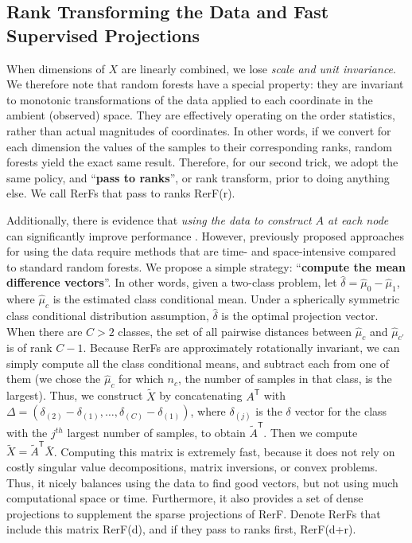 \documentclass{article}
\providecommand{\mt}[1]{\widetilde{#1}}
\providecommand{\mh}[1]{\hat{#1}}
\newcommand{\T}{^{\ensuremath{\mathsf{T}}}}           %
\begin{document}
\subsection{Rank Transforming the Data and Fast Supervised Projections}

When dimensions of $X$ are linearly combined, we lose {\em{scale and unit invariance}}. We therefore note that random forests have a special property: they are invariant to monotonic transformations of the data applied to each coordinate in the ambient (observed) space. They are effectively operating on the order statistics, rather than actual magnitudes of coordinates. In other words, if we convert for each dimension the values of the samples to their corresponding ranks, random forests yield the exact same result. Therefore, for our second trick, we adopt the same policy, and ``{\bf{pass to ranks}}'', or rank transform,  prior to doing anything else. We call RerFs that pass to ranks RerF(r).

Additionally, there is evidence that {\em{using the data to construct $A$ at each node}} can significantly improve performance \cite{Heath1993}. However, previously proposed approaches for using the data require methods that are time- and space-intensive compared to standard random forests.  We propose a simple strategy: ``{\bf{compute the mean difference vectors}}''. In other words, given a two-class problem, let $\mh{\delta}=\mh{\mu}_0-\mh{\mu}_1$, where $\mh{\mu}_c$ is the estimated class conditional mean. Under a spherically symmetric class conditional distribution assumption, $\mh{\delta}$ is the optimal projection vector. When there are $C>2$ classes, the set of all pairwise distances between $\mh{\mu}_c$ and $\mh{\mu}_{c'}$ is of rank $C-1$. Because RerFs are approximately rotationally invariant, we can simply compute all the class conditional means, and subtract each from one of them (we chose the $\mh{\mu}_c$ for which $n_c$, the number of samples in that class, is the largest). Thus, we construct $\mt{X}$ by concatenating $A\T$ with $\Delta=(\delta_{(2)} - \delta_{(1)}, \ldots, \delta_{(C)} - \delta_{(1)})$, where $\delta_{(j)}$ is the $\delta$ vector for the class with the $j^{th}$ largest number of samples, to obtain $\mt{A}\T$. Then we compute $\mt{X} = \mt{A}\T\bar{X}$. Computing this matrix is extremely fast, because it does not rely on costly singular value decompositions, matrix inversions, or convex problems. Thus, it nicely balances using the data to find good vectors, but not using much computational space or time. Furthermore, it also provides a set of dense projections to supplement the sparse projections of RerF. Denote RerFs that include this matrix RerF(d), and if they pass to ranks first, RerF(d+r). 
\end{document}
